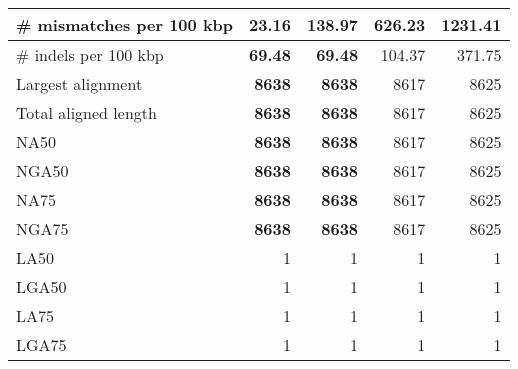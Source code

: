 \documentclass[12pt,a4paper]{article}
\begin{document}
\begin{table}[ht]
\begin{center}
\begin{tabular}{|l*{4}{|r}|}
\# mismatches per 100 kbp & {\bf 23.16} & 138.97 & 626.23 & 1231.41 \\ \hline
\# indels per 100 kbp & {\bf 69.48} & {\bf 69.48} & 104.37 & 371.75 \\ \hline
Largest alignment & {\bf 8638} & {\bf 8638} & 8617 & 8625 \\ \hline
Total aligned length & {\bf 8638} & {\bf 8638} & 8617 & 8625 \\ \hline
NA50 & {\bf 8638} & {\bf 8638} & 8617 & 8625 \\ \hline
NGA50 & {\bf 8638} & {\bf 8638} & 8617 & 8625 \\ \hline
NA75 & {\bf 8638} & {\bf 8638} & 8617 & 8625 \\ \hline
NGA75 & {\bf 8638} & {\bf 8638} & 8617 & 8625 \\ \hline
LA50 & 1 & 1 & 1 & 1 \\ \hline
LGA50 & 1 & 1 & 1 & 1 \\ \hline
LA75 & 1 & 1 & 1 & 1 \\ \hline
LGA75 & 1 & 1 & 1 & 1 \\ \hline
\end{tabular}
\end{center}
\end{table}
\end{document}
